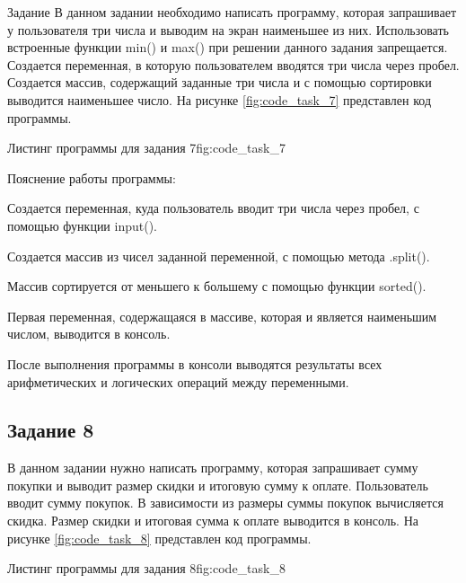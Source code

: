 \documentclass[]{vvsu}
\begin{document}
\begin{addition}{Задание}
В данном задании необходимо написать программу, которая запрашивает у пользователя три числа и выводим на экран наименьшее из них. Использовать встроенные функции min() и max() при решении данного задания запрещается.
Создается переменная, в которую пользователем вводятся три числа через пробел. Создается массив, содержащий заданные три числа и с помощью сортировки выводится наименьшее число.  
На рисунке \ref{fig:code_task_7} представлен код программы.

\begin{vvsu_figure}{Листинг программы для задания 7}{fig:code_task_7}
  \begin{minipage}{.75\textwidth}
    
  \end{minipage}
\end{vvsu_figure}

Пояснение работы программы:
\begin{vvsu_list}
  \item Создается переменная, куда пользователь вводит три числа через пробел, с помощью функции input().
  \item Создается массив из чисел заданной переменной, с помощью метода .split().
  \item Массив сортируется от меньшего к большему с помощью функции sorted().
  \item Первая переменная, содержащаяся в массиве, которая и является наименьшим числом, выводится в консоль.
\end{vvsu_list}

После выполнения программы в консоли выводятся результаты всех арифметических и логических операций между переменными.

\subsection{Задание 8}

В данном задании нужно написать программу, которая запрашивает сумму покупки и выводит размер скидки и итоговую сумму к оплате.  
Пользователь вводит сумму покупок. В зависимости из размеры суммы покупок вычисляется скидка. Размер скидки и итоговая сумма к оплате выводится в консоль.
На рисунке \ref{fig:code_task_8} представлен код программы.

\begin{vvsu_figure}{Листинг программы для задания 8}{fig:code_task_8}
  \begin{minipage}{.75\textwidth}
    
  \end{minipage}
\end{vvsu_figure}


\end{addition}
\end{document}
